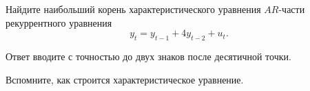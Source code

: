 
\begin{question}
Найдите наибольший корень характеристического уравнения \(AR\)-части рекуррентного уравнения
\[
y_t = y_{t-1} + 4 y_{t-2} + u_t.
\]

Ответ вводите с точностью до двух знаков после десятичной точки.
\end{question}

\begin{solution}
Вспомните, как строится характеристическое уравнение.
\end{solution}

